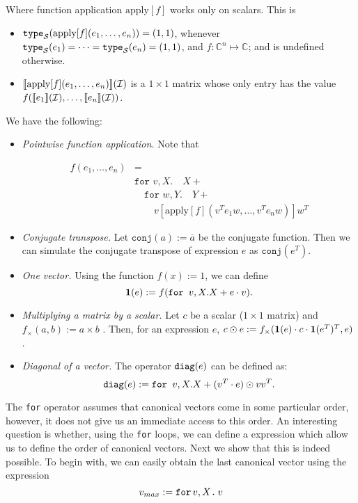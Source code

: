 Where function application $\text{apply}[f]$ works only on scalars. This is 

\begin{itemize}
\item $\texttt{type}_{\mathcal{S}}(\text{apply}[f](e_1,\ldots ,e_n)) = (1,1)$, whenever $\texttt{type}_{\mathcal{S}}(e_1)= \cdots =\texttt{type}_{\mathcal{S}}(e_n)=(1,1)$, and $f:\mathbb{C}^n\mapsto \mathbb{C}$; and is undefined otherwise.
\item $\llbracket \text{apply}[f](e_1,\ldots ,e_n) \rrbracket(\mathcal{I})$ is a $1\times 1$ matrix whose only entry has the value $f(\llbracket e_1 \rrbracket(\mathcal{I}),\ldots ,\llbracket e_n \rrbracket(\mathcal{I}))$.
\end{itemize}

We have the following:

\begin{itemize}
\item {\em Pointwise function application.} Note that

\begin{align*}
f(e_1,\ldots, e_n)&=\\ 
&\texttt{for }v,X.\quad X + \\
&\quad \texttt{for }w,Y.\quad Y + \\ 
&\quad \quad v\left[ \text{apply}[f](v^Te_1w, \ldots, v^Te_nw) \right] w^T 
\end{align*}

\item {\em Conjugate transpose.} Let $\texttt{conj}(a) := \overline{a}$ be the conjugate function. Then we can simulate the conjugate transpose of expression $e$ as $\texttt{conj}(e^T)$.
\item {\em One vector.} Using the function $f(x) := 1$, we can define $$\mathbf{1}(e) := f(\texttt{for } v,X. X + e\cdot v).$$
\item {\em Multiplying a matrix by a scalar.} Let $c$ be a scalar ($1\times 1$ matrix) and $f_{\times}(a, b) := a \times b$ . Then, for an expression $e$, $c\odot e := f_{\times}(\mathbf{1}(e)\cdot c \cdot \mathbf{1}(e^T)^T, e)$.
\item {\em Diagonal of a vector.} The operator $\texttt{diag}(e)$ can be defined as:
$$\texttt{diag}(e) := \texttt{for } v, X. X + (v^T\cdot e) \odot vv^T.$$
\end{itemize}

\medskip

 The \texttt{for} operator assumes that canonical vectors come in some particular order, however, it does not give us an immediate access to this order. An interesting question is whether, using the \texttt{for} loops, we can define a \langfor expression which allow us to define the order of canonical vectors. Next we show that this is indeed possible. To begin with, we can easily obtain the last canonical vector using the expression $$v_{max} := \texttt{for}\, v,X \texttt{.}\, v$$

